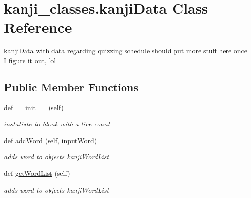 \hypertarget{classkanji__classes_1_1kanji_data}{}\section{kanji\+\_\+classes.\+kanji\+Data Class Reference}
\label{classkanji__classes_1_1kanji_data}


\mbox{\hyperlink{classkanji__classes_1_1kanji_data}{kanji\+Data}} with data regarding quizzing schedule should put more stuff here once I figure it out, lol  


\subsection*{Public Member Functions}
\begin{DoxyCompactItemize}
\item 
\mbox{\label{classkanji__classes_1_1kanji_data_a8d2f83ab7611ada2d11676fc683b5318}} 
def \mbox{\hyperlink{classkanji__classes_1_1kanji_data_a8d2f83ab7611ada2d11676fc683b5318}{\+\_\+\+\_\+init\+\_\+\+\_\+}} (self)
\begin{DoxyCompactList}\small\item\em instatiate to blank with a live count \end{DoxyCompactList}\item 
\mbox{\label{classkanji__classes_1_1kanji_data_a3375aa3d8dcefe9be811ef66a59454af}} 
def \mbox{\hyperlink{classkanji__classes_1_1kanji_data_a3375aa3d8dcefe9be811ef66a59454af}{add\+Word}} (self, input\+Word)
\begin{DoxyCompactList}\small\item\em adds word to object\textquotesingle{}s kanji\+Word\+List \end{DoxyCompactList}\item 
\mbox{\label{classkanji__classes_1_1kanji_data_a487d79141bed456b01af6f5965e49a5b}} 
def \mbox{\hyperlink{classkanji__classes_1_1kanji_data_a487d79141bed456b01af6f5965e49a5b}{get\+Word\+List}} (self)
\begin{DoxyCompactList}\small\item\em adds word to object\textquotesingle{}s kanji\+Word\+List \end{DoxyCompactList}\item 

\end{DoxyCompactItemize}
